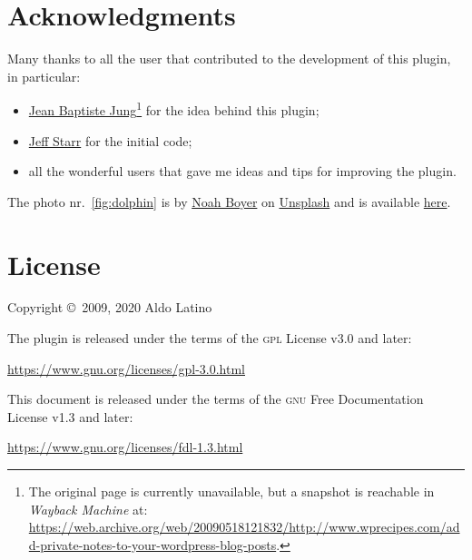 	\section*{Acknowledgments}

	Many thanks to all the user that contributed to the development of this
	plugin, in particular:

	\begin{itemize}
		\item
		\href{http://www.wprecipes.com/add-private-notes-to-your-wordpress-blog-posts}{Jean
		Baptiste Jung}\footnote{The original page is currently unavailable, but a
		snapshot is reachable in \emph{Wayback Machine} at:
		\url{https://web.archive.org/web/20090518121832/http://www.wprecipes.com/add-private-notes-to-your-wordpress-blog-posts}.}
		for the idea behind this plugin;
		\item \href{http://digwp.com/2010/05/private-content-posts-shortcode}{Jeff Starr}
		for the initial code;
		\item all the wonderful users that gave me ideas and tips for improving
		the plugin.
	\end{itemize}

	\noindent The photo nr.~\vref{fig:dolphin} is by
	\href{https://unsplash.com/@emerald_}{Noah Boyer} on
	\href{https://unsplash.com}{Unsplash} and is available \href{https://unsplash.com/photos/dgBOx1e3Mbs}{here}.

	\section*{License}

	Copyright \copyright~2009, 2020  Aldo Latino

	\noindent The plugin is released under the terms of the \textsc{gpl} License
	v3.0 and later:

	\begin{center}
		\url{https://www.gnu.org/licenses/gpl-3.0.html}
	\end{center}

	\noindent This document is released under the terms of the \textsc{gnu} Free
	Documentation License v1.3 and later:

	\begin{center}
		\url{https://www.gnu.org/licenses/fdl-1.3.html}
	\end{center}
\endgroup
